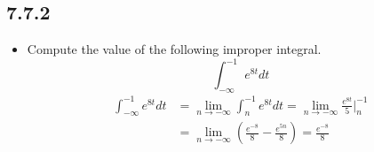 \begin{itemize}
    \subsection{7.7.2}
    \begin{itemize}
      \item Compute the value of the following improper integral.
        \[%
        \int_{-\infty}^{-1} e^{8t}dt
        \]%
        \begin{align*}
          \int_{-\infty}^{-1} e^{8t}dt &= \lim_{n \to -\infty} \int_{n}^{-1} e^{8t}dt
          = \lim_{n \to -\infty} \frac{e^{8t}}{5}\bigg|_n^{-1} \\
          &=\lim_{n \to -\infty} \left( \frac{e^{-8}}{8} - \frac{e^{5n}}{8} \right)
          = \frac{e^{-8}}{8}
        \end{align*}
    \end{itemize}
\end{itemize}
